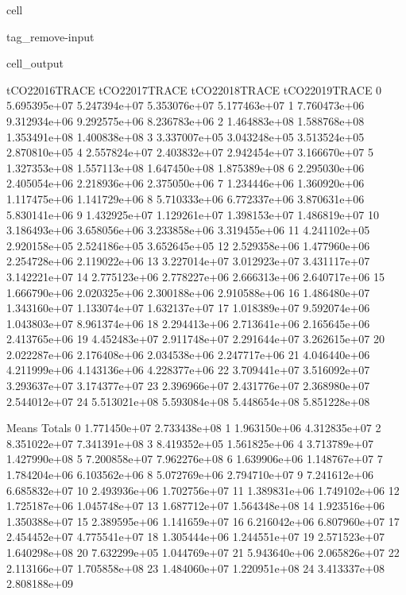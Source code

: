 \documentclass[letterpaper,10pt,english]{jupyterBook}
\begin{document}
\begin{sphinxuseclass}{cell}
\begin{sphinxuseclass}{tag_remove-input}
\begin{sphinxVerbatimOutput}
\begin{sphinxuseclass}{cell_output}
\begin{sphinxVerbatim}[commandchars=\\\{\}]
    tCO2\PYGZus{}2016\PYGZus{}TRACE  tCO2\PYGZus{}2017\PYGZus{}TRACE  tCO2\PYGZus{}2018\PYGZus{}TRACE  tCO2\PYGZus{}2019\PYGZus{}TRACE  \PYGZbs{}
0      5.695395e+07     5.247394e+07     5.353076e+07     5.177463e+07   
1      7.760473e+06     9.312934e+06     9.292575e+06     8.236783e+06   
2      1.464883e+08     1.588768e+08     1.353491e+08     1.400838e+08   
3      3.337007e+05     3.043248e+05     3.513524e+05     2.870810e+05   
4      2.557824e+07     2.403832e+07     2.942454e+07     3.166670e+07   
5      1.327353e+08     1.557113e+08     1.647450e+08     1.875389e+08   
6      2.295030e+06     2.405054e+06     2.218936e+06     2.375050e+06   
7      1.234446e+06     1.360920e+06     1.117475e+06     1.141729e+06   
8      5.710333e+06     6.772337e+06     3.870631e+06     5.830141e+06   
9      1.432925e+07     1.129261e+07     1.398153e+07     1.486819e+07   
10     3.186493e+06     3.658056e+06     3.233858e+06     3.319455e+06   
11     4.241102e+05     2.920158e+05     2.524186e+05     3.652645e+05   
12     2.529358e+06     1.477960e+06     2.254728e+06     2.119022e+06   
13     3.227014e+07     3.012923e+07     3.431117e+07     3.142221e+07   
14     2.775123e+06     2.778227e+06     2.666313e+06     2.640717e+06   
15     1.666790e+06     2.020325e+06     2.300188e+06     2.910588e+06   
16     1.486480e+07     1.343160e+07     1.133074e+07     1.632137e+07   
17     1.018389e+07     9.592074e+06     1.043803e+07     8.961374e+06   
18     2.294413e+06     2.713641e+06     2.165645e+06     2.413765e+06   
19     4.452483e+07     2.911748e+07     2.291644e+07     3.262615e+07   
20     2.022287e+06     2.176408e+06     2.034538e+06     2.247717e+06   
21     4.046440e+06     4.211999e+06     4.143136e+06     4.228377e+06   
22     3.709441e+07     3.516092e+07     3.293637e+07     3.174377e+07   
23     2.396966e+07     2.431776e+07     2.368980e+07     2.544012e+07   
24     5.513021e+08     5.593084e+08     5.448654e+08     5.851228e+08   

           Means        Totals  
0   1.771450e+07  2.733438e+08  
1   1.963150e+06  4.312835e+07  
2   8.351022e+07  7.341391e+08  
3   8.419352e+05  1.561825e+06  
4   3.713789e+07  1.427990e+08  
5   7.200858e+07  7.962276e+08  
6   1.639906e+06  1.148767e+07  
7   1.784204e+06  6.103562e+06  
8   5.072769e+06  2.794710e+07  
9   7.241612e+06  6.685832e+07  
10  2.493936e+06  1.702756e+07  
11  1.389831e+06  1.749102e+06  
12  1.725187e+06  1.045748e+07  
13  1.687712e+07  1.564348e+08  
14  1.923516e+06  1.350388e+07  
15  2.389595e+06  1.141659e+07  
16  6.216042e+06  6.807960e+07  
17  2.454452e+07  4.775541e+07  
18  1.305444e+06  1.244551e+07  
19  2.571523e+07  1.640298e+08  
20  7.632299e+05  1.044769e+07  
21  5.943640e+06  2.065826e+07  
22  2.113166e+07  1.705858e+08  
23  1.484060e+07  1.220951e+08  
24  3.413337e+08  2.808188e+09  
\end{sphinxVerbatim}


\end{sphinxuseclass}
\end{sphinxVerbatimOutput}
\end{sphinxuseclass}
\end{sphinxuseclass}
\end{document}
